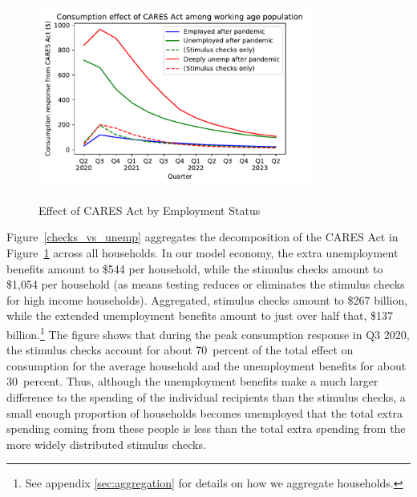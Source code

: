 \begin{figure}
	\centering
	\caption{Effect of CARES Act by Employment Status}
	\label{stim_by_emp}
	{ \includegraphics[width=0.8\textwidth]{./Figures/ConDeltaByEmpState}}
\end{figure}

Figure~\ref{checks_vs_unemp} aggregates the decomposition of the CARES Act in Figure~\ref{stim_by_emp} across all households.
In our model economy, the extra unemployment benefits amount to \$544 per household, while the stimulus checks amount to \$1,054 per household (as means testing reduces or eliminates the stimulus checks for high income households).
Aggregated, stimulus checks amount to \$267 billion, while the extended unemployment benefits amount to just over half that, \$137 billion.\footnote{See appendix \ref{sec:aggregation} for details on how we aggregate households.}
The figure shows that during the peak consumption response in Q3 2020, the stimulus checks account for about 70~percent of the total effect on consumption for the average household and the unemployment benefits for about 30~percent.  Thus, although the unemployment benefits make a much larger difference to the spending of the individual recipients than the stimulus checks, a small enough proportion of households becomes unemployed that the total extra spending coming from these people is less than the total extra spending from the more widely distributed stimulus checks.

